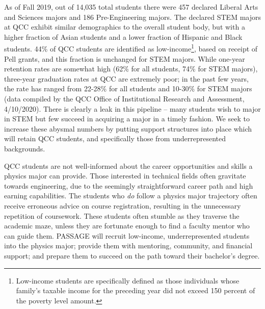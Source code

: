 \documentclass[12pt]{article}
\begin{document}
As of Fall 2019, out of 14,035 total students there were 457 declared Liberal Arts and Sciences majors and 186 Pre-Engineering majors.  The declared STEM majors at QCC exhibit similar demographics to the overall student body, but with a higher fraction of Asian students and a lower fraction of Hispanic and Black students.   44\% of QCC students are identified as low-income\footnote{Low-income students are specifically defined as those individuals whose family's taxable income for the preceding year did not exceed 150 percent of the poverty level amount.}, based on receipt of Pell grants, and this fraction is unchanged for STEM majors.  While one-year retention rates are somewhat high (62\% for all students, 74\% for STEM majors), three-year graduation rates at QCC are extremely poor; in the past few years, the rate has ranged from 22-28\% for all students and 10-30\% for STEM majors (data compiled by the QCC Office of Institutional Research and Assessment, 4/10/2020).  There is clearly a leak in this pipeline -- many students wish to major in STEM but few succeed in acquiring a major in a timely fashion.  We seek to increase these abysmal numbers by putting support structures into place which will retain QCC students, and specifically those from underrepresented backgrounds.



QCC students are not well-informed about the career opportunities and skills a physics major can provide.  
Those interested in technical fields often gravitate towards engineering, due to the seemingly straightforward career path and high earning capabilities.  The students who {\em do} follow a physics major trajectory often receive erroneous advice on course registration, resulting in the unnecessary repetition of coursework.  These students often stumble as they traverse the academic maze, unless they are fortunate enough to find a faculty mentor who can guide them.  PASSAGE will recruit low-income, underrepresented students into the physics major; provide them with mentoring, community, and financial support; and prepare them to succeed on the path toward their bachelor's degree.\\
\vspace{-3mm}
\end{document}
